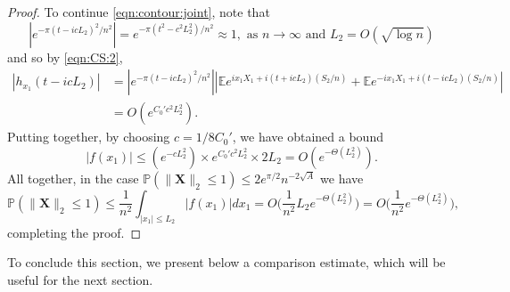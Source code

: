 \documentclass[reqno]{amsart}
\renewcommand\P{{\mathbb{P}}}
\newcommand\BMX{{\bm X}}
\theoremstyle{plain}
\theoremstyle{definition}
\begin{document}
\begin{proof}
To continue \eqref{eqn:contour:joint}, note that
$$|e^{-\pi  (t-icL_{2})^{2}/n^{2}}| = e^{-\pi (t^{2} - c^{2}L_{2}^{2})/n^{2}} \approx 1, \mbox{ as $n\to \infty$ and $L_{2}=O(\sqrt{\log n})$}$$
and so by \eqref{eqn:CS:2},
\begin{align*}
|h_{x_{1}}(t-icL_{2})| &= |e^{-\pi  (t-icL_{2})^{2}/n^{2}}| |\mathbb{E} e^{i x_{1} X_{1} + i (t+icL_{2}) (S_{2}/n)} +  \mathbb{E} e^{-i x_{1} X_{1} +i (t-icL_{2}) (S_{2}/n)} | \\
&= O(e^{C_{0}'c^{2}L_{2}^{2}}).
\end{align*}
Putting together, by choosing $c=1/8C_{0}'$, we have obtained a bound
$$|f(x_{1})| \le (e^{-cL_{2}^{2}}) \times e^{C_{0}'c^{2}L_{2}^{2}} \times 2L_{2} =O(e^{-\Theta(L_{2}^{2})}).$$
All together, in the case $\P(\|\BMX\|_{2} \le 1)\le 2e^{\pi /2} n^{-2\sqrt{A}}$ we have 
$$\P(\|\BMX\|_{2}\le 1)  \le \frac{1}{n^{2}}\int_{|x_{1}|\le  L_{2}} |f(x_{1})| dx_{1} =O\Big(\frac{1}{n^{2}} L_{2} e^{-\Theta(L_{2}^{2})}\Big) = O\Big(\frac{1}{n^{2}}e^{-\Theta(L_{2}^{2})}\Big),$$
completing the proof.
\end{proof}

To conclude this section, we present below a comparison estimate, which will be useful for the next section.
\end{document}
